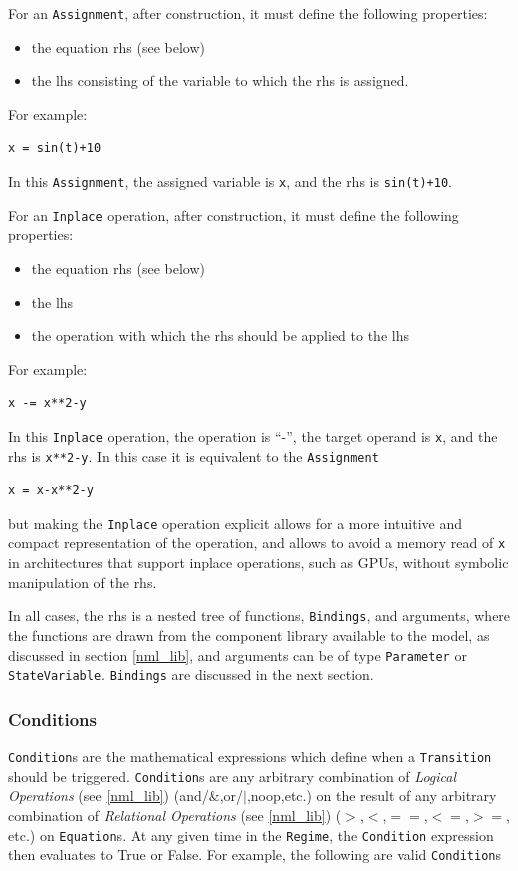 \documentclass[a4paper]{article}
\newcommand\nmlClass[1]{{\tt #1}}
\begin{document}
For an \nmlClass{Assignment}, after construction, it must define the following properties:
\begin{itemize}
\item the equation rhs (see below)
\item the lhs consisting of the variable to which the rhs is assigned.
\end{itemize}
For example:
\begin{lstlisting}[style=display]
x = sin(t)+10
\end{lstlisting}
In this \nmlClass{Assignment}, the assigned variable is \verb^x^, and the rhs is \verb^sin(t)+10^.

For an \nmlClass{Inplace} operation, after construction, it must define the following properties:
\begin{itemize}
\item the equation rhs (see below)
\item the lhs
\item the operation with which the rhs should be applied to the lhs
\end{itemize}
For example:
\begin{lstlisting}[style=display]
x -= x**2-y
\end{lstlisting}
In this \nmlClass{Inplace} operation, the operation is ``-'', the target operand
is \verb^x^, and the rhs is \verb^x**2-y^.  In this case it is
equivalent to the \nmlClass{Assignment}
\begin{lstlisting}[style=display]
x = x-x**2-y
\end{lstlisting}
but making the \nmlClass{Inplace} operation explicit allows for a more intuitive
and compact representation of the operation, and allows to avoid a
memory read of \verb^x^ in architectures that support inplace
operations, such as GPUs, without symbolic manipulation of the rhs.

In all cases, the rhs is a nested tree of functions, \nmlClass{Bindings}, and arguments,
where the functions are drawn from the component library available to
the model, as discussed in section \ref{nml_lib}, and arguments
can be of type \nmlClass{Parameter} or \nmlClass{StateVariable}.  \nmlClass{Bindings} are discussed in the next section.

\subsubsection{Conditions}

\nmlClass{Condition}s are the mathematical expressions which define
when a \nmlClass{Transition} should be triggered.
\nmlClass{Condition}s are any arbitrary combination of \emph{Logical
  Operations} (see \ref{nml_lib}) (and/$\&$,or/$|$,noop,etc.) on the
result of any arbitrary combination of \emph{Relational Operations}
(see \ref{nml_lib}) ($>$,$<$,$==$,$<=$,$>=$, etc.) on \nmlClass{Equation}s.  At
any given time in the \nmlClass{Regime}, the \nmlClass{Condition}
expression then evaluates to True or False.  For example, the
following are valid \nmlClass{Condition}s
\end{document}
